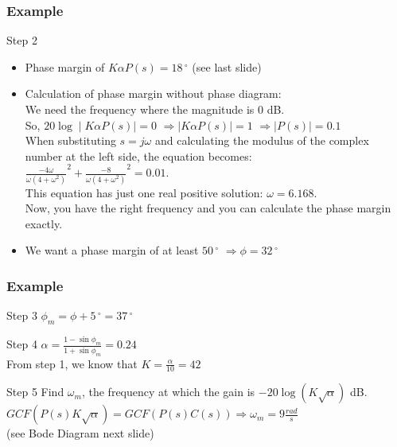 \begin{frame}
\frametitle{Example}
\begin{block}{Step 2}
	\begin{itemize}
\item Phase margin of $K\alpha P(s) = 18\,^{\circ}$ (see last slide) \\
\item Calculation of phase margin without phase diagram: \\
We need the frequency where the magnitude is 0 dB. \\So, $20\log \mid K\alpha P(s) \mid = 0$
$\Rightarrow \mid K\alpha P(s) \mid = 1$
$\Rightarrow \mid P(s) \mid = 0.1$ \\
When substituting $s = j\omega$ and calculating the modulus of the complex number at the left side, the equation becomes: \\
$\frac{-4\omega}{\omega (4 + \omega^2)}^2 + \frac{-8}{\omega (4 + \omega^2)}^2 = 0.01$. \\
This equation has just one real positive solution: $\omega = 6.168$.\\
Now, you have the right frequency and you can calculate the phase margin exactly. 
\item We want a phase margin of at least $50\,^{\circ}$
$\Rightarrow \phi = 32\,^{\circ}$
\end{itemize}
\end{block}
\end{frame}

\begin{frame}
	\frametitle{Example}
\begin{block}{Step 3}
	$\phi_m = \phi + 5\,^{\circ} = 37\,^{\circ}$
\end{block}
	\begin{block}{Step 4}
		$\alpha = \frac{1 - \sin \phi_m}{1 + \sin \phi_m} = 0.24$ \\
		From step 1, we know that $K = \frac{\alpha}{10} = 42$
	\end{block}
	\begin{block}{Step 5}
		Find $\omega_m$, the frequency at which the gain is $-20\log(K\sqrt{\alpha})$ dB. 
		$GCF(P(s)K\sqrt{\alpha}) = GCF(P(s)C(s)) \Rightarrow \omega_m = 9 \frac{rad}{s}$ \\
		(see Bode Diagram next slide)
	\end{block}
\end{frame}

